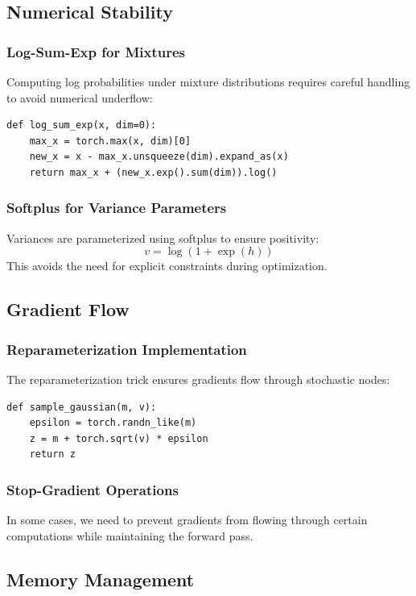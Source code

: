 \documentclass{article}
\begin{document}
\subsection{Numerical Stability}

\subsubsection{Log-Sum-Exp for Mixtures}
Computing log probabilities under mixture distributions requires careful handling to avoid numerical underflow:

\begin{verbatim}
def log_sum_exp(x, dim=0):
    max_x = torch.max(x, dim)[0]
    new_x = x - max_x.unsqueeze(dim).expand_as(x)
    return max_x + (new_x.exp().sum(dim)).log()
\end{verbatim}

\subsubsection{Softplus for Variance Parameters}
Variances are parameterized using softplus to ensure positivity:
\[
v = \log(1 + \exp(h))
\]
This avoids the need for explicit constraints during optimization.

\subsection{Gradient Flow}

\subsubsection{Reparameterization Implementation}
The reparameterization trick ensures gradients flow through stochastic nodes:

\begin{verbatim}
def sample_gaussian(m, v):
    epsilon = torch.randn_like(m)
    z = m + torch.sqrt(v) * epsilon
    return z
\end{verbatim}

\subsubsection{Stop-Gradient Operations}
In some cases, we need to prevent gradients from flowing through certain computations while maintaining the forward pass.

\subsection{Memory Management}
\end{document}
